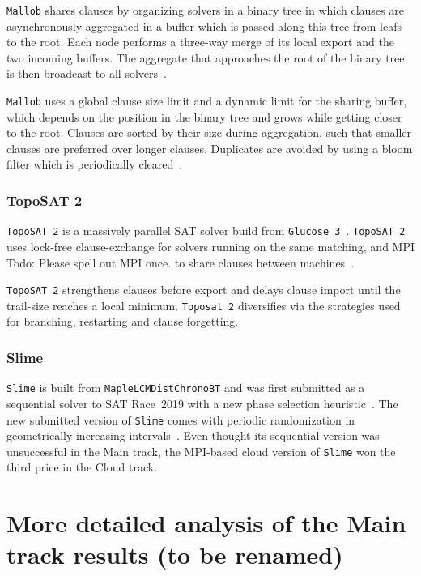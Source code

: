 \documentclass{elsarticle}
\newcommand{\todo}[1]{{\color{purple}Todo: #1}}
\newcommand{\solver}[1]{\texttt{#1}}
\begin{document}
\solver{Mallob} shares clauses by organizing solvers in a binary tree in which clauses are asynchronously aggregated in a buffer which is passed along this tree from leafs to the root. 
Each node performs a three-way merge of its local export and the two incoming buffers. 
The aggregate that approaches the root of the binary tree is then broadcast to all solvers~\cite{}. 

\solver{Mallob} uses a global clause size limit and a dynamic limit for the sharing buffer, which depends on the position in the binary tree and grows while getting closer to the root. 
Clauses are sorted by their size during aggregation, such that smaller clauses are preferred over longer clauses. 
Duplicates are avoided by using a bloom filter which is periodically cleared~\cite{}. 


\subsubsection{TopoSAT 2}

\solver{TopoSAT~2} is a massively parallel SAT solver build from \solver{Glucose~3}~\cite{Glucose3,Toposat2}. 
\solver{TopoSAT~2} uses lock-free clause-exchange for solvers running on the same matching, and MPI \todo{Please spell out MPI once.}
to share clauses between machines~\cite{ManySat,Proceedings}. 

\solver{TopoSAT~2} strengthens clauses before export and delays clause import until the trail-size reaches a local minimum. 
\solver{Toposat~2} diversifies via the strategies used for branching, restarting and clause forgetting. 


\subsubsection{Slime}

\solver{Slime} is built from \solver{MapleLCMDistChronoBT} and was first submitted as a sequential solver to SAT Race~2019 with a new phase selection heuristic~\cite{SlimeSATRace2019}. 
The new submitted version of \solver{Slime} comes with periodic randomization in geometrically increasing intervals~\cite{}. 
Even thought its sequential version was unsuccessful in the Main track, the MPI-based cloud version of \solver{Slime} won the third price in the Cloud track. 

\section{More detailed analysis of the Main track results (to be renamed)}
\end{document}
